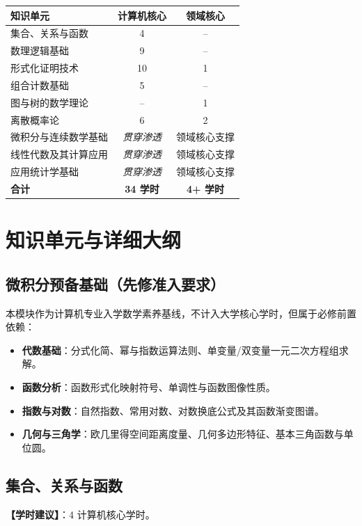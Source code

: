 \begin{table}[H]
\centering
\setlength{\tabcolsep}{3.5pt}\fontsize{8pt}{9.6pt}\selectfont\begin{tabularx}{\columnwidth}{Y c c}
\toprule
\textbf{知识单元} & \textbf{计算机核心} & \textbf{领域核心} \\
\midrule
集合、关系与函数 & 4 & -- \\
数理逻辑基础 & 9 & -- \\
形式化证明技术 & 10 & 1 \\
组合计数基础 & 5 & -- \\
图与树的数学理论 & -- & 1 \\
离散概率论 & 6 & 2 \\
微积分与连续数学基础 & \emph{贯穿渗透} & 领域核心支撑 \\
线性代数及其计算应用 & \emph{贯穿渗透} & 领域核心支撑 \\
应用统计学基础 & \emph{贯穿渗透} & 领域核心支撑 \\
\midrule
\textbf{合计} & \textbf{34 学时} & \textbf{4+ 学时} \\
\bottomrule
\end{tabularx}
\end{table}

\section{知识单元与详细大纲}

\subsection{微积分预备基础（先修准入要求）}
本模块作为计算机专业入学数学素养基线，不计入大学核心学时，但属于必修前置依赖：
\begin{itemize}
    \item \textbf{代数基础}：分式化简、幂与指数运算法则、单变量/双变量一元二次方程组求解。
    \item \textbf{函数分析}：函数形式化映射符号、单调性与函数图像性质。
    \item \textbf{指数与对数}：自然指数、常用对数、对数换底公式及其函数渐变图谱。
    \item \textbf{几何与三角学}：欧几里得空间距离度量、几何多边形特征、基本三角函数与单位圆。
\end{itemize}

\subsection{集合、关系与函数}
\textbf{【学时建议】}：4 计算机核心学时。

